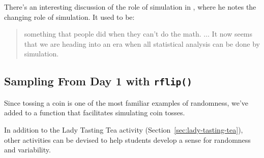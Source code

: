 There's an interesting discussion of the role of simulation in \cite{speed:2011}, where
he notes the changing role of simulation.  It used to be:
\begin{quote}
something that people did when they can't do the math. $\ldots$ It now seems that we
are heading into an era when all statistical analysis can be done by simulation.
\end{quote}


\subsection{Sampling From Day 1 with \texttt{rflip()}}

Since tossing a coin is one of the most familiar examples of randomness, we've added to
 a function that facilitates simulating coin tosses. 
\begin{knitrout}
\end{knitrout}



In addition to the Lady Tasting Tea activity (Section~\ref{sec:lady-tasting-tea}),
other activities can be devised to help students develop a sense for randomness 
and variability.

